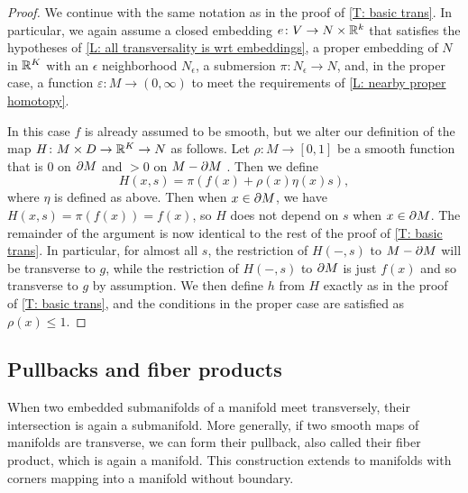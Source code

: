 \begin{proof}
	We continue with the same notation as in the proof of \cref{T: basic trans}.
	In particular, we again assume a closed embedding $e \colon V \to N \times \mathbb{R}^k$ that satisfies the hypotheses of \cref{L: all transversality is wrt embeddings}, a proper embedding of $N$ in $\mathbb{R}^K$ with an $\epsilon$ neighborhood $N_\epsilon$, a submersion $\pi \colon N_\epsilon \to N$, and, in the proper case, a function $\varepsilon \colon M \to (0,\infty)$ to meet the requirements of \cref{L: nearby proper homotopy}.

	In this case $f$ is already assumed to be smooth, but we alter our definition of the map $H \colon M \times D \to \mathbb{R}^K \to N$ as follows.
	Let $\rho \colon M \to [0,1]$ be a smooth function that is $0$ on $\partial M$ and $>0$ on $M-\partial M$ \cite[Proposition 5.43]{Lee13}.
	Then we define
	$$H(x,s) = \pi(f(x)+ \rho(x)\eta(x)s),$$
	where $\eta$ is defined as above.
	Then when $x \in \partial M$, we have $H(x,s) = \pi(f(x)) = f(x)$, so $H$ does not depend on $s$ when $x \in \partial M$.
	The remainder of the argument is now identical to the rest of the proof of \cref{T: basic trans}.
	In particular, for almost all $s$, the restriction of $H(-,s)$ to $M - \partial M$ will be transverse to $g$, while the restriction of $H(-,s)$ to $\partial M$ is just $f(x)$ and so transverse to $g$ by assumption.
	We then define $h$ from $H$ exactly as in the proof of \cref{T: basic trans}, and the conditions in the proper case are satisfied as $\rho(x)\leq 1$.
\end{proof}

\subsection{Pullbacks and fiber products}\label{S: pullbacks}

When two embedded submanifolds of a manifold meet transversely, their intersection is again a submanifold.
More generally, if two smooth maps of manifolds are transverse, we can form their pullback, also called their fiber product, which is again a manifold.
This construction extends to manifolds with corners mapping into a manifold without boundary.

